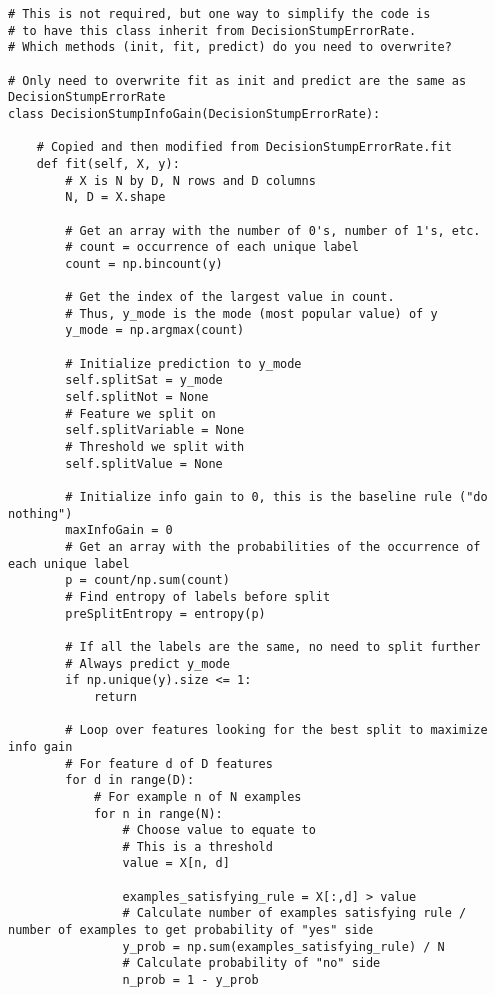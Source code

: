 \documentclass{article}
\begin{document}
\begin{lstlisting}
# This is not required, but one way to simplify the code is
# to have this class inherit from DecisionStumpErrorRate.
# Which methods (init, fit, predict) do you need to overwrite?

# Only need to overwrite fit as init and predict are the same as DecisionStumpErrorRate
class DecisionStumpInfoGain(DecisionStumpErrorRate):
    
    # Copied and then modified from DecisionStumpErrorRate.fit
    def fit(self, X, y):
        # X is N by D, N rows and D columns
        N, D = X.shape

        # Get an array with the number of 0's, number of 1's, etc.
        # count = occurrence of each unique label
        count = np.bincount(y)
        
        # Get the index of the largest value in count.
        # Thus, y_mode is the mode (most popular value) of y
        y_mode = np.argmax(count)

        # Initialize prediction to y_mode
        self.splitSat = y_mode
        self.splitNot = None
        # Feature we split on
        self.splitVariable = None
        # Threshold we split with
        self.splitValue = None
    
        # Initialize info gain to 0, this is the baseline rule ("do nothing")
        maxInfoGain = 0
        # Get an array with the probabilities of the occurrence of each unique label
        p = count/np.sum(count)
        # Find entropy of labels before split
        preSplitEntropy = entropy(p)

        # If all the labels are the same, no need to split further
        # Always predict y_mode
        if np.unique(y).size <= 1:
            return

        # Loop over features looking for the best split to maximize info gain
        # For feature d of D features
        for d in range(D):
            # For example n of N examples
            for n in range(N):
                # Choose value to equate to
                # This is a threshold
                value = X[n, d]

                examples_satisfying_rule = X[:,d] > value
                # Calculate number of examples satisfying rule / number of examples to get probability of "yes" side
                y_prob = np.sum(examples_satisfying_rule) / N
                # Calculate probability of "no" side
                n_prob = 1 - y_prob


\end{lstlisting}
\end{document}
